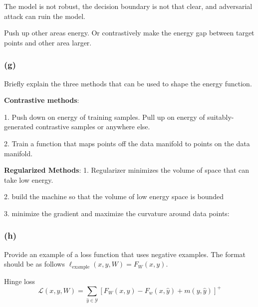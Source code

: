 The model is not robust, the decision boundary is not that clear, and adversarial attack can ruin the model.

Push up other areas energy. Or contrastively make the energy gap between target points and other area larger.



\subsubsection*{(g)}
Briefly explain the three methods that can be used to shape the energy function.

\textbf{Contrastive methods}:

1. Push down on energy of training samples. Pull up on energy of suitably-generated contrastive samples or anywhere else.

2. Train a function that maps points off the data manifold to points on the data manifold.

\textbf{Regularized Methods}:
1. Regularizer minimizes the volume of space that can take low energy.

2. build the machine so that the volume of low energy space is bounded

3. minimize the gradient and maximize the curvature around data points:

\subsubsection*{(h)}
Provide an example of a loss function that uses negative examples. The format should be as follows $\ell_\text{example}(x, y, W) = F_W(x, y)$.


Hinge loss
\begin{equation}
    \mathcal{L}(x, y, W)=\sum_{\hat{y} \in \mathcal{Y}}\left[F_{W}(x, y)-F_{w}(x, \hat{y})+m(y, \hat{y})\right]^{+}
\end{equation}






